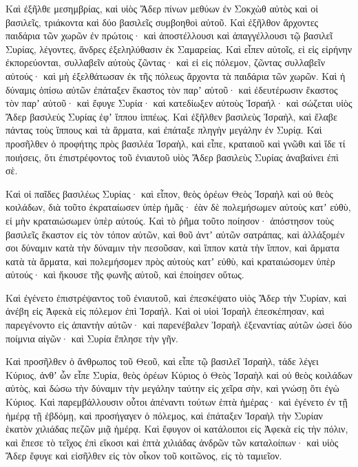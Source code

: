 {Καὶ ἐξῆλθε μεσημβρίας, καὶ υἱὸς Ἄδερ πίνων μεθύων ἐν Σοκχὼθ αὐτὸς καὶ οἱ βασιλεῖς, τριάκοντα καὶ δύο βασιλεῖς συμβοηθοὶ αὐτοῦ.
Καὶ ἐξῆλθον ἄρχοντες παιδάρια τῶν χωρῶν ἐν πρώτοις· καὶ ἀποστέλλουσι καὶ ἀπαγγέλλουσι τῷ βασιλεῖ Συρίας, λέγοντες, ἄνδρες ἐξεληλύθασιν ἐκ Σαμαρείας.
Καὶ εἶπεν αὐτοῖς, εἰ εἰς εἰρήνην ἐκπορεύονται, συλλαβεῖν αὐτοὺς ζῶντας· καὶ εἰ εἰς πόλεμον, ζῶντας συλλαβεῖν αὐτούς·
καὶ μὴ ἐξελθάτωσαν ἐκ τῆς πόλεως ἄρχοντα τὰ παιδάρια τῶν χωρῶν. Καὶ ἡ δύναμις ὀπίσω αὐτῶν
ἐπάταξεν ἕκαστος τὸν παρʼ αὐτοῦ· καὶ ἐδευτέρωσιν ἕκαστος τὸν παρʼ αὐτοῦ· καὶ ἔφυγε Συρία· καὶ κατεδίωξεν αὐτοὺς Ἰσραήλ· καὶ σώζεται υἱὸς Ἄδερ βασιλεὺς Συρίας ἐφʼ ἵππου ἱππέως.
Καὶ ἐξῆλθεν βασιλεὺς Ἰσραὴλ, καὶ ἔλαβε πάντας τοὺς ἵππους καὶ τὰ ἅρματα, καὶ ἐπάταξε πληγὴν μεγάλην ἐν Συρίᾳ.
Καὶ προσῆλθεν ὁ προφήτης πρὸς βασιλέα Ἰσραὴλ, καὶ εἶπε, κραταιοῦ καὶ γνῶθι καὶ ἴδε τί ποιήσεις, ὅτι ἐπιστρέφοντος τοῦ ἐνιαυτοῦ υἱὸς Ἄδερ βασιλεὺς Συρίας ἀναβαίνει ἐπὶ σὲ.
\par }{\PP {}Καὶ οἱ παῖδες βασιλέως Συρίας· καὶ εἶπον, θεὸς ὀρέων Θεὸς Ἰσραὴλ καὶ οὐ θεὸς κοιλάδων, διὰ τοῦτο ἐκραταίωσεν ὑπὲρ ἡμᾶς· ἐὰν δὲ πολεμήσωμεν αὐτοὺς κατʼ εὐθὺ, εἰ μὴν κραταιώσωμεν ὑπὲρ αὐτούς.
Καὶ τὸ ῥῆμα τοῦτο ποίησον· ἀπόστησον τοὺς βασιλεῖς ἕκαστον εἰς τὸν τόπον αὐτῶν, καὶ θοῦ ἀντʼ αὐτῶν σατράπας,
καὶ ἀλλάξομέν σοι δύναμιν κατὰ τὴν δύναμιν τὴν πεσοῦσαν, καὶ ἵππον κατὰ τὴν ἵππον, καὶ ἅρματα κατὰ τὰ ἅρματα, καὶ πολεμήσομεν πρὸς αὐτοὺς κατʼ εὐθὺ, καὶ κραταιώσομεν ὑπὲρ αὐτούς· καὶ ἤκουσε τῆς φωνῆς αὐτοῦ, καὶ ἐποίησεν οὕτως.
\par }{\PP {}Καὶ ἐγένετο ἐπιστρέψαντος τοῦ ἐνιαυτοῦ, καὶ ἐπεσκέψατο υἱὸς Ἄδερ τὴν Συρίαν, καὶ ἀνέβη εἰς Ἀφεκὰ εἰς πόλεμον ἐπὶ Ἰσραήλ.
Καὶ οἱ υἱοὶ Ἰσραὴλ ἐπεσκέπησαν, καὶ παρεγένοντο εἰς ἀπαντὴν αὐτῶν· καὶ παρενέβαλεν Ἰσραὴλ ἐξεναντίας αὐτῶν ὡσεὶ δύο ποίμνια αἰγῶν· καὶ Συρία ἔπλησε τὴν γῆν.
\par }{\PP {}Καὶ προσῆλθεν ὁ ἄνθρωπος τοῦ Θεοῦ, καὶ εἶπε τῷ βασιλεῖ Ἰσραὴλ, τάδε λέγει Κύριος, ἀνθʼ ὧν εἶπε Συρία, θεὸς ὀρέων Κύριος ὁ Θεὸς Ἰσραὴλ καὶ οὐ θεὸς κοιλάδων αὐτὸς, καὶ δώσω τὴν δύναμιν τὴν μεγάλην ταύτην εἰς χεῖρα σὴν, καὶ γνώσῃ ὅτι ἐγὼ Κύριος.
Καὶ παρεμβάλλουσιν οὗτοι ἀπέναντι τούτων ἑπτὰ ἡμέρας· καὶ ἐγένετο ἐν τῇ ἡμέρᾳ τῇ ἑβδόμῃ, καὶ προσήγαγεν ὁ πόλεμος, καὶ ἐπάταξεν Ἰσραὴλ τὴν Συρίαν ἑκατὸν χιλιάδας πεζῶν μιᾷ ἡμέρᾳ.
Καὶ ἔφυγον οἱ κατάλοιποι εἰς Ἀφεκὰ εἰς τὴν πόλιν, καὶ ἔπεσε τὸ τεῖχος ἐπὶ εἴκοσι καὶ ἑπτὰ χιλιάδας ἀνδρῶν τῶν καταλοίπων· καὶ υἱὸς Ἄδερ ἔφυγε καὶ εἰσῆλθεν εἰς τὸν οἶκον τοῦ κοιτῶνος, εἰς τὸ ταμιεῖον.
}
